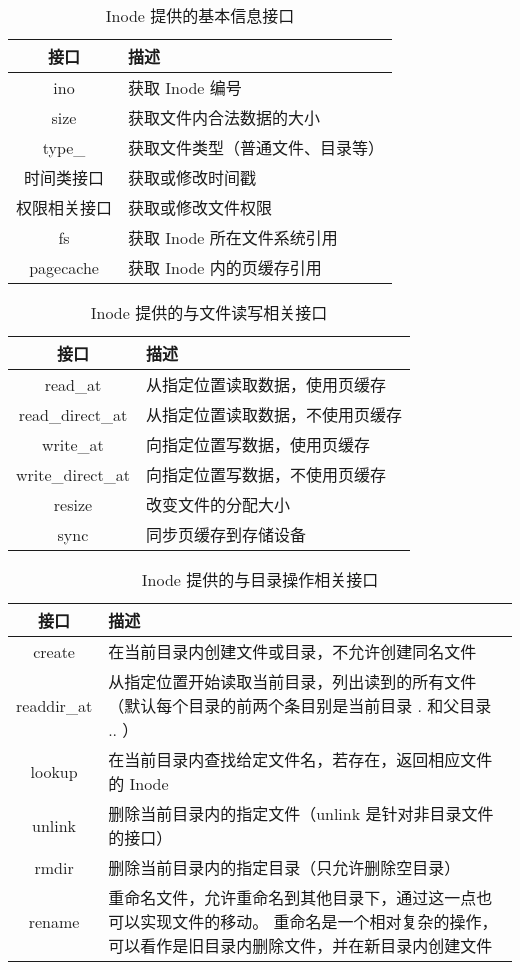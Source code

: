 \begin{table}[h]
    \centering
    \begin{tabularx}{\textwidth}{|c|Y|}
    \hline
    接口 & 描述 \\
    \hline
    ino & 获取 Inode 编号\\
    \hline
    size & 获取文件内合法数据的大小\\
    \hline
    type\_ & 获取文件类型（普通文件、目录等）\\
    \hline
    时间类接口 & 获取或修改时间戳\\
    \hline
    权限相关接口 & 获取或修改文件权限\\
    \hline
    fs & 获取 Inode 所在文件系统引用\\
    \hline
    pagecache & 获取 Inode 内的页缓存引用\\
    \hline
    \end{tabularx}
    \caption{Inode 提供的基本信息接口}
    \label{tab:basic}
\end{table}

\begin{table}[h]
    \centering
    \begin{tabularx}{\textwidth}{|c|Y|}
    \hline
    接口 & 描述 \\
    \hline
    read\_at & 从指定位置读取数据，使用页缓存\\
    \hline
    read\_direct\_at & 从指定位置读取数据，不使用页缓存\\
    \hline
    write\_at & 向指定位置写数据，使用页缓存\\
    \hline
    write\_direct\_at & 向指定位置写数据，不使用页缓存\\
    \hline
    resize & 改变文件的分配大小\\
    \hline
    sync & 同步页缓存到存储设备\\
    \hline
    \end{tabularx}
    \caption{Inode 提供的与文件读写相关接口}
    \label{tab:io}
\end{table}

\begin{table}[h]
    \centering
    \begin{tabularx}{\textwidth}{|c|Y|}
    \hline
    接口 & 描述 \\
    \hline
    create & 在当前目录内创建文件或目录，不允许创建同名文件\\
    \hline
    readdir\_at & 从指定位置开始读取当前目录，列出读到的所有文件
    （默认每个目录的前两个条目别是当前目录 . 和父目录 .. ）\\
    \hline
    lookup & 在当前目录内查找给定文件名，若存在，返回相应文件的 Inode\\
    \hline
    unlink & 删除当前目录内的指定文件（unlink 是针对非目录文件的接口）\\
    \hline
    rmdir & 删除当前目录内的指定目录（只允许删除空目录）\\
    \hline
    rename & 重命名文件，允许重命名到其他目录下，通过这一点也可以实现文件的移动。
    重命名是一个相对复杂的操作，可以看作是旧目录内删除文件，并在新目录内创建文件\\
    \hline
    \end{tabularx}
    \caption{Inode 提供的与目录操作相关接口}
    \label{tab:dir}
\end{table}
